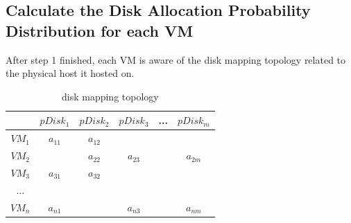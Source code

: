 \documentclass[11pt,a4paper]{article}
\begin{document}
\begin{itemize}
\begin{table}[!ht]
\centering
{}
\end{table}
\end{itemize}

\subsection{\textbf {Calculate the Disk Allocation Probability Distribution for each VM }}
\label{sec:problem1}
After step 1 finished, each VM is aware of the disk mapping topology related to the physical 
host it hosted on. 

\begin{table}
\centering
\caption{disk mapping topology}
\begin{tabular}{|c|c|c|c|c|c|}
\hline
& $pDisk_1$ & $pDisk_2$ & $pDisk_3$ & ... & $pDisk_m$ \\
\hline
$VM_1$ & $a_{11}$ & $a_{12}$ & & & \\
\hline
$VM_2$ & & $a_{22}$ & $a_{23}$ & & $a_{2m}$ \\
\hline
$VM_3$ & $a_{31}$ & $a_{32}$ & & & \\
\hline
... & & & & & \\
\hline
$VM_n$ & $a_{n1}$ & & $a_{n3}$ & & $a_{nm}$ \\
\hline
\end{tabular}
\label{table:topology}
\end{table}
\end{document}
